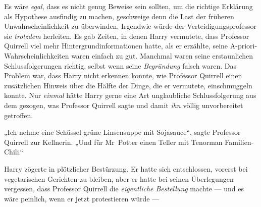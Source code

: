 Es wäre \emph{egal}, dass es nicht genug Beweise sein sollten, um die richtige Erklärung als Hypothese ausfindig zu machen, geschweige denn die Last der früheren Unwahrscheinlichkeit zu überwinden. Irgendwie würde der Verteidigungsprofessor sie \emph{trotzdem} herleiten. Es gab Zeiten, in denen Harry vermutete, dass Professor Quirrell viel mehr Hintergrundinformationen hatte, als er erzählte, seine A-priori-Wahrscheinlichkeiten waren einfach zu gut. Manchmal waren seine erstaunlichen Schlussfolgerungen richtig, selbst wenn seine \emph{Begründung} falsch waren. Das Problem war, dass Harry nicht erkennen konnte, wie Professor Quirrell einen zusätzlichen Hinweis über die Hälfte der Dinge, die er vermutete, einschmuggeln konnte. Nur \emph{einmal} hätte Harry gerne eine Art unglaubliche Schlussfolgerung aus dem gezogen, was Professor Quirrell sagte und damit \emph{ihn} völlig unvorbereitet getroffen.

\later

„Ich nehme eine Schüssel grüne Linsensuppe mit Sojasauce“, sagte Professor Quirrell zur Kellnerin.
„Und für Mr~Potter einen Teller mit Tenorman Familien-Chili.“

Harry zögerte in plötzlicher Bestürzung. Er hatte sich entschlossen, vorerst bei vegetarischen Gerichten zu bleiben, aber er hatte bei seinen Überlegungen vergessen, dass Professor Quirrell die \emph{eigentliche Bestellung} machte — und es wäre peinlich, wenn er jetzt protestieren würde —

